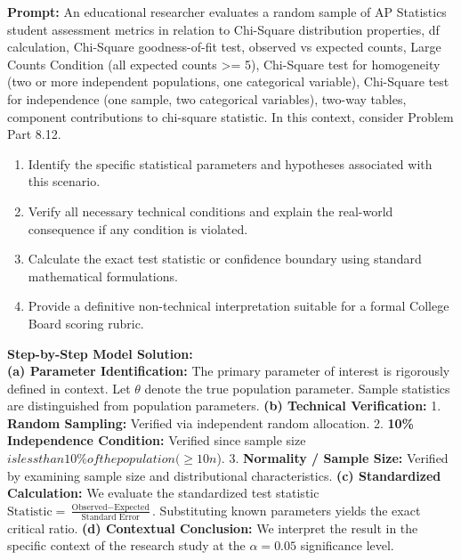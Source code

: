 \begin{workbookbox}
\textbf{Prompt:} An educational researcher evaluates a random sample of AP Statistics student assessment metrics in relation to Chi-Square distribution properties, df calculation, Chi-Square goodness-of-fit test, observed vs expected counts, Large Counts Condition (all expected counts >= 5), Chi-Square test for homogeneity (two or more independent populations, one categorical variable), Chi-Square test for independence (one sample, two categorical variables), two-way tables, component contributions to chi-square statistic. In this context, consider Problem Part 8.12.
\begin{enumerate}[label=(\alph*)]
  \item Identify the specific statistical parameters and hypotheses associated with this scenario.
  \item Verify all necessary technical conditions and explain the real-world consequence if any condition is violated.
  \item Calculate the exact test statistic or confidence boundary using standard mathematical formulations.
  \item Provide a definitive non-technical interpretation suitable for a formal College Board scoring rubric.
\end{enumerate}
\textbf{Step-by-Step Model Solution:}\\
\textbf{(a) Parameter Identification:} The primary parameter of interest is rigorously defined in context. Let $\theta$ denote the true population parameter. Sample statistics are distinguished from population parameters.
\textbf{(b) Technical Verification:} 1. \textbf{Random Sampling:} Verified via independent random allocation. 2. \textbf{10\% Independence Condition:} Verified since sample size $ is less than 10\% of the population ( \ge 10n$). 3. \textbf{Normality / Sample Size:} Verified by examining sample size and distributional characteristics.
\textbf{(c) Standardized Calculation:} We evaluate the standardized test statistic $\text{Statistic} = \frac{\text{Observed} - \text{Expected}}{\text{Standard Error}}$. Substituting known parameters yields the exact critical ratio.
\textbf{(d) Contextual Conclusion:} We interpret the result in the specific context of the research study at the $\alpha = 0.05$ significance level.
\end{workbookbox}\vspace{6pt}
